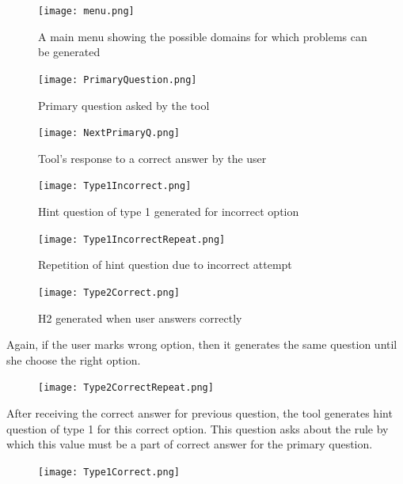 \begin{figure}
\centering
\texttt{[image: menu.png]}
\caption{A main menu showing the possible domains for which problems can be generated}
\label{fig:main-menu}
\end{figure}

\begin{figure}
\centering
\texttt{[image: PrimaryQuestion.png]}
\caption{Primary question asked by the tool}
\label{fig:primary-ques}
\end{figure}

\begin{figure}
\centering
\texttt{[image: NextPrimaryQ.png]}
\caption{Tool's response to a correct answer by the user}
\label{fig:primary-correct}
\end{figure}

\begin{figure}
\centering
\texttt{[image: Type1Incorrect.png]}
\caption{Hint question of type 1 generated for incorrect option}
\label{fig:hint-h1}
\end{figure}

\begin{figure}
\centering
\texttt{[image: Type1IncorrectRepeat.png]}
\caption{Repetition of hint question due to incorrect attempt}
\label{fig:hint-repeat}
\end{figure}

\begin{figure}
\centering
\texttt{[image: Type2Correct.png]}
\caption{H2 generated when user answers correctly}
\label{fig:hint-h1-h2}
\end{figure}

Again, if the user marks wrong option, then it generates the same question until she choose the right option.

\begin{figure}
\centering
\texttt{[image: Type2CorrectRepeat.png]}
\end{figure}

After receiving the correct answer for previous question, the tool generates hint question of type 1 for this correct option. This question asks about the rule by which this value must be a part of correct answer for the primary question.

\begin{figure}
\centering
\texttt{[image: Type1Correct.png]}
\end{figure}

